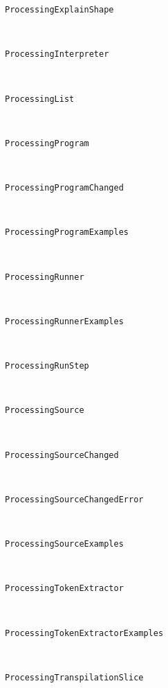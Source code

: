 \begin{description}
\item[\texttt{ProcessingExplainShape}] \hfill \\
	
\item[\texttt{ProcessingInterpreter}] \hfill \\
	
\item[\texttt{ProcessingList}] \hfill \\
	
\item[\texttt{ProcessingProgram}] \hfill \\
	
\item[\texttt{ProcessingProgramChanged}] \hfill \\
	
\item[\texttt{ProcessingProgramExamples}] \hfill \\
	
\item[\texttt{ProcessingRunner}] \hfill \\
	
\item[\texttt{ProcessingRunnerExamples}] \hfill \\
	
\item[\texttt{ProcessingRunStep}] \hfill \\
	
\item[\texttt{ProcessingSource}] \hfill \\
	
\item[\texttt{ProcessingSourceChanged}] \hfill \\
	
\item[\texttt{ProcessingSourceChangedError}] \hfill \\
	
\item[\texttt{ProcessingSourceExamples}] \hfill \\
	
\item[\texttt{ProcessingTokenExtractor}] \hfill \\
	
\item[\texttt{ProcessingTokenExtractorExamples}] \hfill \\
	
\item[\texttt{ProcessingTranspilationSlice}] \hfill \\
	

\end{description}
